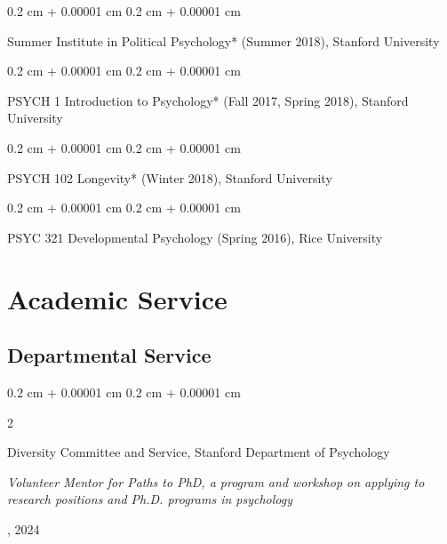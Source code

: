 \documentclass[10pt, letterpaper]{article}
\newenvironment{onecolentry}{
    \begin{adjustwidth}{
        0.2 cm + 0.00001 cm
    }{
        0.2 cm + 0.00001 cm
    }
}{
    \end{adjustwidth}
} %
\newenvironment{twocolentry}[2][]{
    \onecolentry
    \def\secondColumn{#2}
    \setcolumnwidth{\fill, 4.5 cm}
    \begin{paracol}{2}
}{
    \switchcolumn \raggedleft \secondColumn
    \end{paracol}
    \endonecolentry
} %
\begin{document}
        \begin{onecolentry}
        Summer Institute in Political Psychology* (Summer 2018), Stanford University
        \end{onecolentry}
        \vspace{0.2 cm}

        \begin{onecolentry}
        PSYCH 1 Introduction to Psychology* (Fall 2017, Spring 2018), Stanford University
        \end{onecolentry}
        \vspace{0.2 cm}

        \begin{onecolentry}
        PSYCH 102 Longevity* (Winter 2018), Stanford University
        \end{onecolentry}
        \vspace{0.2 cm}

        \begin{onecolentry}
        PSYC 321 Developmental Psychology (Spring 2016), Rice University
        \end{onecolentry}

    
    
    \section{Academic Service}
    \subsection{Departmental Service}
    \begin{twocolentry}{2021, 2024}
        Diversity Committee and Service, Stanford Department of Psychology
        
        \textit{Volunteer Mentor for Paths to PhD, a program and workshop on applying to research positions and Ph.D. programs in psychology}
        \end{twocolentry}
        
\end{document}
